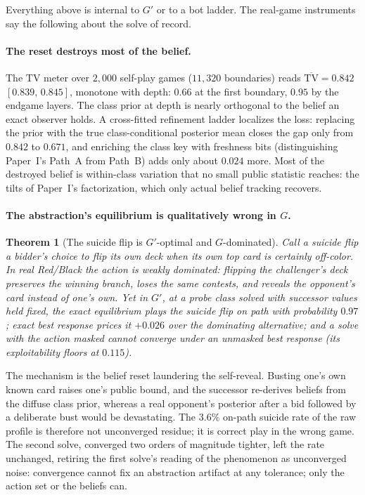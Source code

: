 \documentclass[11pt]{article}
\theoremstyle{plain}
\newtheorem{theorem}{Theorem}[section]
\theoremstyle{definition}
\theoremstyle{remark}
\newcommand{\game}{\ensuremath{G}}
\newcommand{\gp}{\ensuremath{G'}}
\begin{document}
Everything above is internal to $\gp$ or to a bot ladder. The real-game
instruments say the following about the solve of record.

\paragraph{The reset destroys most of the belief.} The TV meter over $2{,}000$
self-play games ($11{,}320$ boundaries) reads $\overline{\mathrm{TV}} =
\mathbf{0.842}$ $[0.839,\,0.845]$, monotone with depth: $0.66$ at the first
boundary, $0.95$ by the endgame layers. The class prior at depth is nearly
orthogonal to the belief an exact observer holds. A cross-fitted refinement
ladder localizes the loss: replacing the prior with the true class-conditional
posterior mean closes the gap only from $0.842$ to $0.671$, and enriching the
class key with freshness bits (distinguishing Paper~I's Path~A from Path~B) adds
only about $0.024$ more. Most of the destroyed belief is within-class variation
that no small public statistic reaches: the tilts of Paper~I's factorization,
which only actual belief tracking recovers.

\paragraph{The abstraction's equilibrium is qualitatively wrong in $\game$.}

\begin{theorem}[The suicide flip is $\gp$-optimal and
$\game$-dominated]\label{thm:suicide}
Call a \emph{suicide flip} a bidder's choice to flip its own deck when
its own top card is certainly off-color. In real Red/Black the action
is weakly dominated: flipping the challenger's deck preserves the
winning branch, loses the same contests, and reveals the opponent's
card instead of one's own. Yet in $\gp$, at a probe class solved with
successor values held fixed, the exact equilibrium plays the suicide
flip on path with probability $0.97$; exact best response prices it
$+0.026$ over the dominating alternative; and a solve with the action
masked cannot converge under an unmasked best response (its
exploitability floors at $0.115$).
\end{theorem}

The mechanism is the belief reset laundering the self-reveal. Busting one's own
known card raises one's public bound, and the successor re-derives beliefs from
the diffuse class prior, whereas a real opponent's posterior after a bid
followed by a deliberate bust would be devastating. The $3.6\%$ on-path suicide
rate of the raw profile is therefore not unconverged residue; it is correct play
in the wrong game. The second solve, converged two orders of magnitude tighter,
left the rate unchanged, retiring the first solve's reading of the phenomenon as
unconverged noise: convergence cannot fix an abstraction artifact at any
tolerance; only the action set or the beliefs can.
\end{document}
